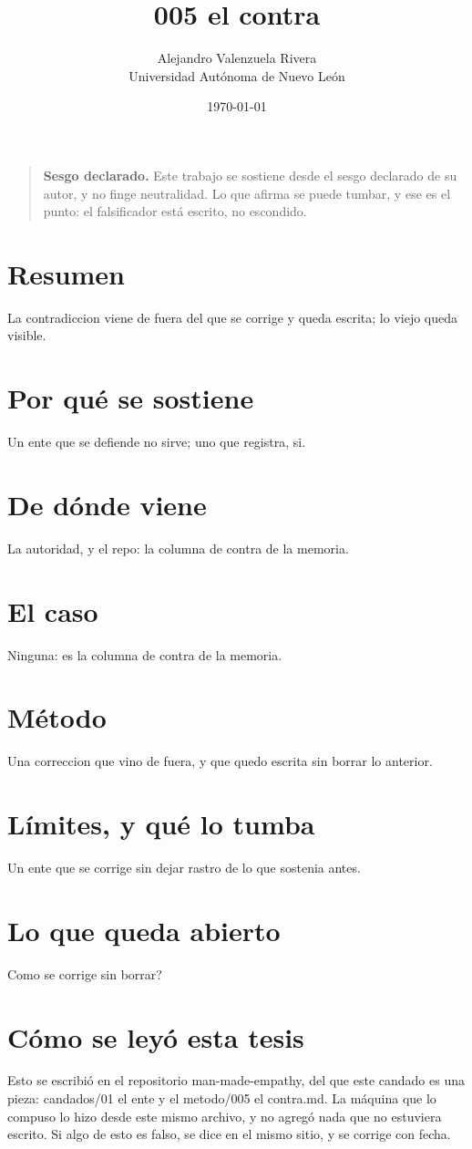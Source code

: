 \documentclass[11pt,a4paper]{article}
\title{005 el contra}
\author{Alejandro Valenzuela Rivera\\\small Universidad Autónoma de Nuevo León}
\date{\today}
\begin{document}
\maketitle

\begin{quote}
\textbf{Sesgo declarado.} Este trabajo se sostiene desde el sesgo declarado de su autor, y no finge neutralidad. Lo que afirma se puede tumbar, y ese es el punto: el falsificador está escrito, no escondido.
\end{quote}

\section*{Resumen}
La contradiccion viene de fuera del que se corrige y queda escrita; lo viejo queda visible.

\section{Por qué se sostiene}
Un ente que se defiende no sirve; uno que registra, si.

\section{De dónde viene}
La autoridad, y el repo: la columna de contra de la memoria.

\section{El caso}
Ninguna: es la columna de contra de la memoria.

\section{Método}
Una correccion que vino de fuera, y que quedo escrita sin borrar lo anterior.

\section{Límites, y qué lo tumba}
Un ente que se corrige sin dejar rastro de lo que sostenia antes.

\section{Lo que queda abierto}
\textquestiondown{}Como se corrige sin borrar?

\section*{Cómo se leyó esta tesis}
Esto se escribió en el repositorio man-made-empathy, del que este candado es una pieza: candados/01 el ente y el metodo/005 el contra.md. La máquina que lo compuso lo hizo desde este mismo archivo, y no agregó nada que no estuviera escrito. Si algo de esto es falso, se dice en el mismo sitio, y se corrige con fecha.
\end{document}
